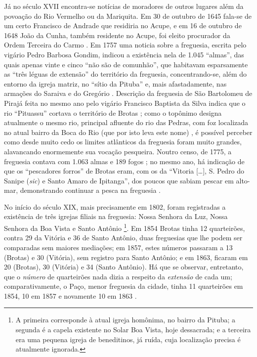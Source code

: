Já no século XVII encontra-se notícias de moradores de outros lugares além da povoação do Rio Vermelho ou da Mariquita. Em 30 de outubro de 1645 fala-se de um certo Francisco de Andrade que residiria no Acupe, e em 16 de outubro de 1648 João da Cunha, também residente no Acupe, foi eleito procurador da Ordem Terceira do Carmo \cite[p.~21]{ott_formaet2_1957}. Em 1757 uma noticia sobre a freguesia, escrita pelo vigário Pedro Barbosa Gondim, indicou a existência nela de 1.045 ``almas'', das quais apenas vinte e cinco ``não são de comunhão'', que habitavam esparsamente as ``três léguas de extensão'' do território da freguesia, concentrando-se, além do entorno da igreja matriz, no ``sítio da Pituba'' e, mais afastadamente, nas armações do Saraiva e do Gregório \cite[p.~183]{castralmeida_ultramar_1908}. Descrição da freguesia de São Bartolomeu de Pirajá feita no mesmo ano pelo vigário Francisco Baptista da Silva indica que o rio ``Pituassu'' cortava o território de Brotas \cite[p.~218]{castralmeida_ultramar_1908}; como o topônimo designa atualmente o mesmo rio, principal afluente do rio das Pedras, com foz localizada no atual bairro da Boca do Rio (que por isto leva este nome) \cite[p.~175-177]{santos_aguas_2010}, é possível perceber como desde muito cedo os limites atlânticos da freguesia foram muito grandes, alavancando enormemente sua vocação pesqueira. Noutro censo, de 1775, a freguesia contava com 1.063 almas e 189 fogos \cite[p.~183]{castralmeida_ultramar_1910}; no mesmo ano, há indicação de que os ``pescadores forros'' de Brotas eram, com os da ``Vitoria [\dots], S. Pedro do Sanipe (\textit{sic}) e Santo Amaro de Ipitanga'', dos poucos que sabiam pescar em alto-mar, demonstrando continuar a pesca na freguesia \cite[p.~294]{castralmeida_ultramar_1910}.

No início do século XIX, mais precisamente em 1802, foram registradas a existência de três igrejas filiais na freguesia: Nossa Senhora da Luz, Nossa Senhora da Boa Vista e Santo Antônio \cite[p.~172]{VASCONCELOS2002}\footnote{A primeira corresponde à atual igreja homônima, no bairro da Pituba; a segunda é a capela existente no Solar Boa Vista, hoje dessacrada; e a terceira era uma pequena igreja de beneditinos, já ruída, cuja localização precisa é atualmente ignorada.}. Em 1854 Brotas tinha 12 quarteirões, contra 29 da Vitória e 36 de Santo Antônio, duas freguesias que lhe podem ser comparadas sem maiores mediações; em 1857, estes números passaram a 13 (Brotas) e 30 (Vitória), sem registro para Santo Antônio; e em 1863, ficaram em 20 (Brotas), 30 (Vitória) e 34 (Santo Antônio). Há que se observar, entretanto, que o \textit{número} de quarteirões nada dizia a respeito da \textit{extensão} de cada um; comparativamente, o Paço, menor freguesia da cidade, tinha 11 quarteirões em 1854, 10 em 1857 e novamente 10 em 1863 \cite[p.~46]{NASCIMENTO2007}.

